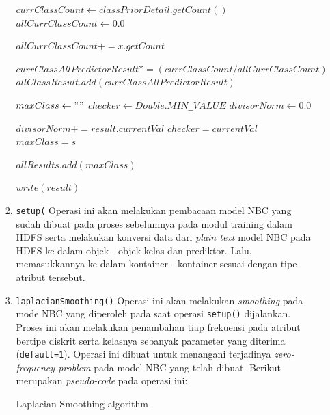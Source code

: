 \begin{enumerate}
\begin{itemize}
\begin{enumerate}
\begin{algorithm}[H]
\begin{algorithmic}[1]
						\State $currClassCount \gets classPriorDetail.getCount()$
						\State $allCurrClassCount \gets 0.0$

							\State $allCurrClassCount += x.getCount$
						\EndFor
												
						\State $currClassAllPredictorResult *= (currClassCount/allCurrClassCount)$
						\State $allClassResult.add(currClassAllPredictorResult)$
					\EndFor					
					
				\EndFor
				
				\State $maxClass \gets ""$
				\State $checker \gets Double.MIN$\verb|_|$VALUE$
				\State $divisorNorm \gets 0.0$
				
					\State $divisorNorm += result.currentVal$
						\State $checker = currentVal$
          				\State $maxClass = s$
					\EndIf
				\EndFor
				
				\State $allResults.add(maxClass)$
				
			\EndFor
			
				\State $write(result)$
			\EndFor

			\EndProcedure
			\end{algorithmic}
			\end{algorithm}
			
			\item{\texttt{setup(}}
			Operasi ini akan melakukan pembacaan model NBC yang sudah dibuat pada proses sebelumnya pada modul training dalam HDFS serta melakukan konversi data dari \textit{plain text} model NBC pada HDFS ke dalam objek - objek kelas dan prediktor. Lalu, memasukkannya ke dalam kontainer - kontainer sesuai dengan tipe atribut tersebut.

			
			\item{\texttt{laplacianSmoothing()}}
			Operasi ini akan melakukan \textit{smoothing} pada mode NBC yang diperoleh pada saat operasi \texttt{setup()} dijalankan. Proses ini akan melakukan penambahan tiap frekuensi pada atribut bertipe diskrit serta kelasnya sebanyak parameter yang diterima (\texttt{default=1}). Operasi ini dibuat untuk menangani terjadinya \textit{zero-frequency problem} pada model NBC yang telah dibuat. Berikut merupakan \textit{pseudo-code} pada operasi ini:
			\begin{algorithm}[H]
			\caption{Laplacian Smoothing algorithm}\label{alg:NBCTestLaplace}
			\begin{algorithmic}[1]


\end{algorithmic}
\end{algorithm}
\end{enumerate}
\end{itemize}
\end{enumerate}
